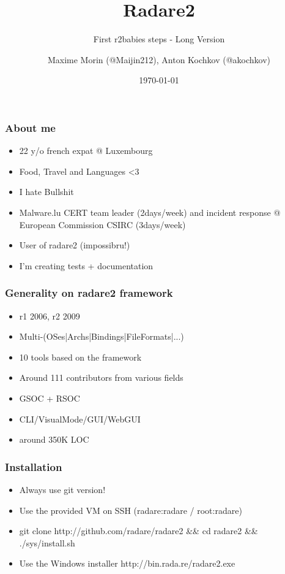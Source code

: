 \documentclass[10pt, compress]{beamer}
\title{Radare2}
\subtitle{First r2babies steps - Long Version}
\author{Maxime Morin (@Maijin212), Anton Kochkov (@akochkov)}
\date{\today}
\institute{BSides Las Vegas}
\begin{document}
\maketitle

\begin{frame}[fragile]
  \frametitle{About me}
    \begin{itemize}
    \item 22 y/o french expat @ Luxembourg
    \item Food, Travel and Languages <3
    \item I hate Bullshit
    \item Malware.lu CERT team leader (2days/week) and incident response @ European Commission CSIRC (3days/week)
    \item User of radare2 (impossibru!)
    \item I'm creating tests + documentation
    \end{itemize}
\end{frame}

\begin{frame}[fragile]
  \frametitle{Generality on radare2 framework}
  \begin{itemize}
  \item r1 2006, r2 2009
  \item Multi-(OSes|Archs|Bindings|FileFormats|...)
  \item 10 tools based on the framework
  \item Around 111 contributors from various fields
  \item GSOC + RSOC
  \item CLI/VisualMode/GUI/WebGUI
  \item around 350K LOC
  \end{itemize}
\end{frame}


\begin{frame}[fragile]
  \frametitle{Installation}
  \begin{itemize}
  \item Always use git version!
  \item Use the provided VM on SSH (\alert{radare:radare} / \alert{root:radare})
  \item git clone \alert{http://github.com/radare/radare2 \&\& cd radare2 \&\& ./sys/install.sh}
  \item Use the Windows installer \alert{http://bin.rada.re/radare2.exe}
  \end{itemize}
\end{frame}
\end{document}
